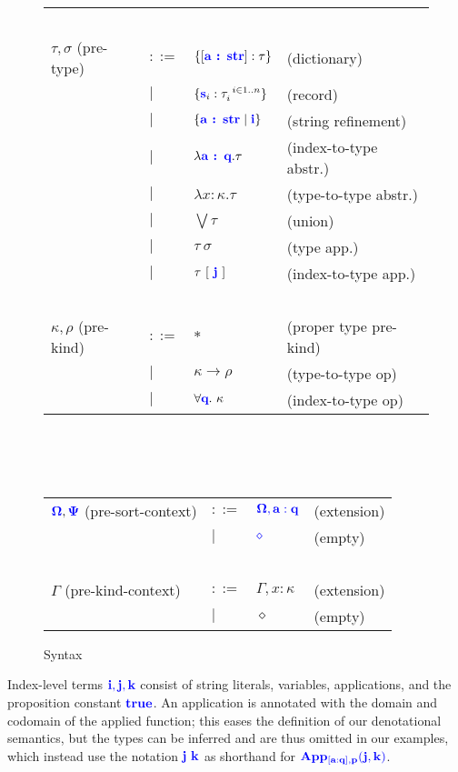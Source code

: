 \documentclass[sigplan,10pt,review,anonymous]{acmart}
\newcommand{\blu}[1]{\textbf{\color{blue}{#1}}}
\newcommand{\blum}[1]{\mathbf{\color{blue}{#1}}}
\begin{document}
\begin{figure}
\begin{tabular}{llll}
~ & ~ & ~ & ~ \\
$\tau,\sigma$ (pre-type) & $::=$ & $\{[\blu{a : str}] : \tau \}$ & (dictionary) \\ 
       & $\mid$ & $\{ \blu{s}_i : \tau_i^{~i \in 1..n} \}$ & (record) \\
       & $\mid$ & $\{ \blu{a : str} \mid \blu{i} \}$ & (string refinement) \\
       & $\mid$ & $\lambda \blu{a : q} . \tau$ & (index-to-type abstr.) \\
       & $\mid$ & $\lambda x : \kappa. \tau$ & (type-to-type abstr.) \\
       & $\mid$ & $\bigvee \tau$ & (union) \\
       & $\mid$ & $\tau~\sigma$ & (type app.) \\
       & $\mid$ & $\tau~[~\blu{j}~]$ & (index-to-type app.)\\
~ & ~ & ~ & ~ \\
$\kappa,\rho$ (pre-kind) & $::=$ & $\ast$ & (proper type pre-kind) \\
                     & $\mid$ & $\kappa \to \rho$ & (type-to-type op)\\
                     & $\mid$ & $\forall \blu{q}.~\kappa$ & (index-to-type op)
\end{tabular}\\~\\~\\
\begin{tabular}{llll}
$\blum{\Omega}, \blum{\Psi}$ (pre-sort-context) & $::=$  & $\blum{\Omega,a : q}$ & (extension) \\
                                     & $\mid$ & $\blum{\diamond}$ & (empty) \\~\\
$\Gamma$ (pre-kind-context) & $::=$ & $\Gamma,x : \kappa$ & (extension) \\
                        & $\mid$ & $\diamond$ & (empty) 
\end{tabular}
\caption{Syntax}
\label{fig:syntax}
\end{figure}

Index-level terms $\blum{i,j,k}$ consist of string literals, variables, applications, and the proposition constant $\blum{true}$. An application is annotated with the domain and codomain of the applied function; this eases the definition of our denotational semantics, but the types can be inferred and are thus omitted in our examples, which instead use the notation $\blum{j}~\blum{k}$ as shorthand for $\blum{App_{[a : q], p}(j,k)}$.
\end{document}
